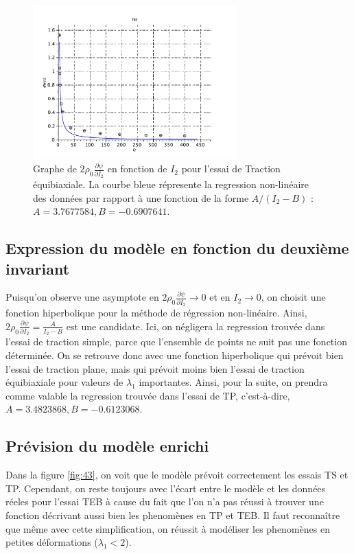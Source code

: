 \documentclass[a4paper,11pt]{article}
\begin{document}
\begin{figure}
\centering
\includegraphics[width=0.7\textwidth]{scilab_prof/q413.pdf}
\caption{Graphe de $2 \rho_0 \frac{\partial\psi}{\partial I_2}$ en fonction de $I_2$ pour l'essai de Traction équibiaxiale. La courbe bleue répresente la regression non-linéaire des données par rapport à une fonction de la forme $A/(I_2-B)$ : $A = 3.7677584, B = -0.6907641$.}
\label{fig:413}
\end{figure}

\subsection{Expression du modèle en fonction du deuxième invariant}
Puisqu'on observe une asymptote en $2 \rho_0 \frac{\partial\psi}{\partial I_2} \rightarrow 0$ et en $I_2 \rightarrow 0$, on choisit une fonction hiperbolique pour la méthode de régression non-linéaire. Ainsi, $2 \rho_0 \frac{\partial\psi}{\partial I_2} = \frac{A}{I_2-B}$ est une candidate. Ici, on négligera la regression trouvée dans l'essai de traction simple, parce que l'ensemble de points ne suit pas une fonction déterminée. On se retrouve donc avec une fonction hiperbolique qui prévoit bien l'essai de traction plane, mais qui prévoit moins bien l'essai de traction équibiaxiale pour valeurs de $\lambda_1$ importantes. Ainsi, pour la suite, on prendra comme valable la regression trouvée dans l'essai de TP, c'est-à-dire, $A = 3.4823868, B = -0.6123068$.

\subsection{Prévision du modèle enrichi}
Dans la figure \ref{fig:43}, on voit que le modèle prévoit correctement les essais TS et TP. Cependant, on reste toujours avec l'écart entre le modèle et les données réeles pour l'essai TEB à cause du fait que l'on n'a pas réussi à trouver une fonction décrivant aussi bien les phenomènes en TP et TEB. Il faut reconnaître que même avec cette simplification, on réussit à modéliser les phenomènes en petites déformations ($\lambda_1 < 2$).
\end{document}
